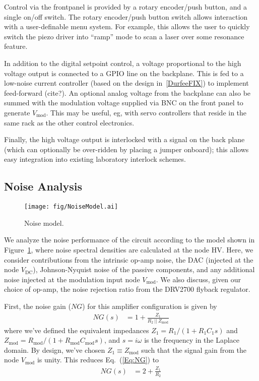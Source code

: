 \documentclass[aip,rsi,reprint]{revtex4-1} %
\newcommand{\epar}{~||~} %
\begin{document}
Control via the frontpanel is provided by a rotary encoder/push button, and a single on/off switch.
The rotary encoder/push button switch allows interaction with a user-definable menu system.
For example, this allows the user to quickly switch the piezo driver into ``ramp'' mode to scan a laser over some resonance feature.

In addition to the digital setpoint control, a voltage proportional to the high voltage output is connected to a GPIO line on the backplane.
This is fed to a low-noise current controller (based on the design in~\ref{DurfeeFIX}) to implement feed-forward (cite?).
An optional analog voltage from the backplane can also be summed with the modulation voltage supplied via BNC on the front panel to generate $V_{\text{mod}}$.
This may be useful, eg, with servo controllers that reside in the same rack as the other control electronics.

Finally, the high voltage output is interlocked with a signal on the back plane (which can optionally be over-ridden by placing a jumper onboard); this allows easy integration into existing laboratory interlock schemes.

\subsection{Noise Analysis}
\label{Sec:NoiseAnalysis}

\begin{figure}[t]
\texttt{[image: fig/NoiseModel.ai]}
\caption{Noise model. \label{Fig:NoiseModel}}
\end{figure}

We analyze the noise performance of the circuit according to the model shown in Figure~\ref{Fig:NoiseModel}, where noise spectral densities are calculated at the node HV.
Here, we consider contributions from the intrinsic op-amp noise, the DAC (injected at the node $V_{\text{DC}}$), Johnson-Nyquist noise of the passive components, and any additional noise injected at the modulation input node $V_{\text{mod}}$.
We also discuss, given our choice of op-amp, the noise rejection ratio from the DRV2700 flyback regulator.

First, the noise gain ($NG$) for this amplifier configuration is given by
\begin{align}
\label{Eq:NG}
NG(s) &= 1 + \frac{Z_1}{R_2 \epar Z_{\text{mod}}}
\end{align}
where we've defined the equivalent impedances $Z_1 = R_1/(1+R_1 C_1 s)$ and $Z_{\text{mod}} = R_{\text{mod}}/(1+R_{\text{mod}} C_{\text{mod}} s)$, and $s = i\omega$ is the frequency in the Laplace domain.
By design, we've chosen $Z_1 \equiv Z_{\text{mod}}$ such that the signal gain from the node $V_{\text{mod}}$ is unity.
This reduces Eq.~(\ref{Eq:NG}) to
\begin{align}
\label{Eq:RedNG}
NG(s) &= 2 + \frac{Z_1}{R_2}
\end{align}
\end{document}
